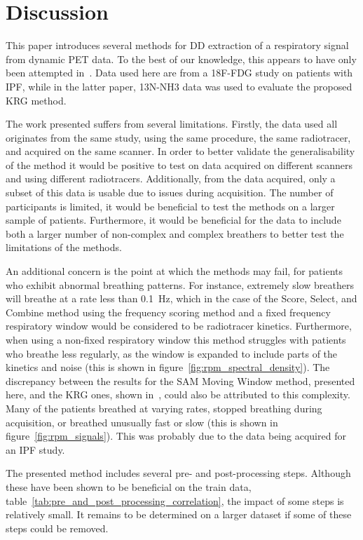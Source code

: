 \section{Discussion} \label{sec:discussion}
    This paper introduces several methods for \gls{DD} extraction of a respiratory signal from dynamic \gls{PET} data. To the best of our knowledge, this appears to have only been attempted in~\parencite{Schleyer2014}. Data used here are from a \gls{18F-FDG} study on patients with \gls{IPF}, while in the latter paper, \gls{13N-NH3} data was used to evaluate the proposed \gls{KRG} method.
    
    The work presented suffers from several limitations. Firstly, the data used all originates from the same study, using the same procedure, the same radiotracer, and acquired on the same scanner. In order to better validate the generalisability of the method it would be positive to test on data acquired on different scanners and using different radiotracers. Additionally, from the data acquired, only a subset of this data is usable due to issues during acquisition. The number of participants is limited, it would be beneficial to test the methods on a larger sample of patients. Furthermore, it would be beneficial for the data to include both a larger number of non-complex and complex breathers to better test the limitations of the methods.
    
    An additional concern is the point at which the methods may fail, for patients who exhibit abnormal breathing patterns. For instance, extremely slow breathers will breathe at a rate less than \SI{0.1}{\hertz}, which in the case of the Score, Select, and Combine method using the frequency scoring method and a fixed frequency respiratory window would be considered to be radiotracer kinetics. Furthermore, when using a non-fixed respiratory window this method struggles with patients who breathe less regularly, as the window is expanded to include parts of the kinetics and noise (this is shown in figure~\ref{fig:rpm_spectral_density}). The discrepancy between the results for the \gls{SAM} Moving Window method, presented here, and the \gls{KRG} ones, shown in~\parencite{Schleyer2014}, could also be attributed to this complexity. Many of the patients breathed at varying rates, stopped breathing during acquisition, or breathed unusually fast or slow (this is shown in figure~\ref{fig:rpm_signals}). This was probably due to the data being acquired for an \gls{IPF} study.

    The presented method includes several pre- and post-processing steps. Although these have been shown to be beneficial on the train data, table~\ref{tab:pre_and_post_processing_correlation}, the impact of some steps is relatively small. It remains to be determined on a larger dataset if some of these steps could be removed.

